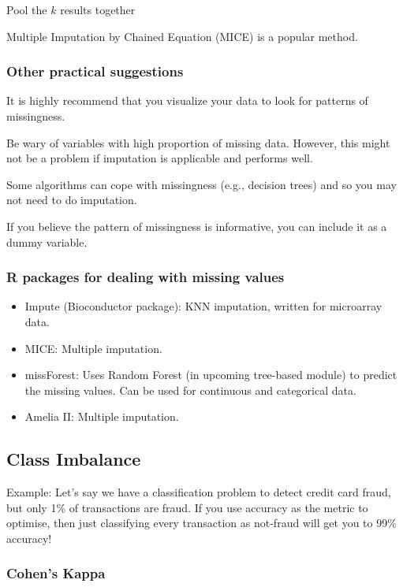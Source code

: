 \step Pool the $k$ results together

Multiple Imputation by Chained Equation (MICE) is a popular method.

\subsubsection{Other practical suggestions}

\indent 

It is highly recommend that you visualize your data to look for patterns of missingness.

Be wary of variables with high proportion of missing data. However, this might not be a problem if imputation is applicable and performs well.

Some algorithms can cope with missingness (e.g., decision trees) and so you may not need to do imputation.

If you believe the pattern of missingness is informative, you can include it as a dummy variable.

\subsubsection{R packages for dealing with missing values}

\begin{itemize}
    \item Impute (Bioconductor package): KNN imputation, written for microarray data.
    \item MICE: Multiple imputation.
    \item missForest: Uses Random Forest (in upcoming tree-based module) to predict the missing values. Can be used for continuous and categorical data.
    \item Amelia II: Multiple imputation.
\end{itemize}

\subsection{Class Imbalance}

\indent 

Example: Let’s say we have a classification problem to detect credit card fraud, but only 1\% of transactions are fraud. If you use accuracy as the metric to optimise, then just classifying every transaction as not-fraud will get you to 99\% accuracy!

\subsubsection{Cohen’s Kappa}

